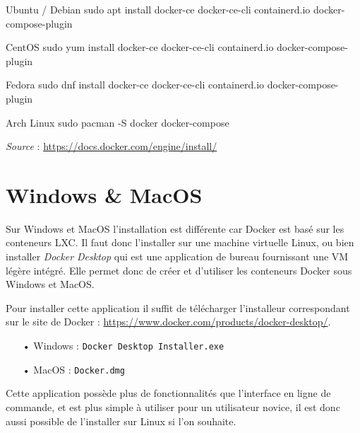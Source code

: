 \begin{bashWithTitle}{Ubuntu / Debian}
sudo apt install docker-ce docker-ce-cli containerd.io docker-compose-plugin
\end{bashWithTitle}

\begin{bashWithTitle}{CentOS}
sudo yum install docker-ce docker-ce-cli containerd.io docker-compose-plugin
\end{bashWithTitle}

\begin{bashWithTitle}{Fedora}
sudo dnf install docker-ce docker-ce-cli containerd.io docker-compose-plugin
\end{bashWithTitle}

\begin{bashWithTitle}{Arch Linux}
sudo pacman -S docker docker-compose
\end{bashWithTitle}

\emph{Source} :
\href{https://docs.docker.com/engine/install/}{https://docs.docker.com/engine/install/}

\section{Windows \& MacOS}

Sur Windows et MacOS l'installation est différente car Docker est basé sur les conteneurs LXC.
Il faut donc l'installer sur une machine virtuelle Linux, ou bien installer \emph{Docker Desktop}
qui est une application de bureau fournissant une VM légère intégré. Elle permet donc de créer
et d'utiliser les conteneurs Docker sous Windows et MacOS.\newline

Pour installer cette application il suffit de télécharger l'installeur correspondant sur le site
de Docker : \href{https://www.docker.com/products/docker-desktop/}{https://www.docker.com/products/docker-desktop/}.

\begin{itemize}
    \item[•] Windows : \verb:Docker Desktop Installer.exe:
    \item[•] MacOS : \verb:Docker.dmg:
\end{itemize}

Cette application possède plus de fonctionnalités que l'interface en ligne de commande, et est plus
simple à utiliser pour un utilisateur novice, il est donc aussi possible de l'installer sur Linux
si l'on souhaite.

